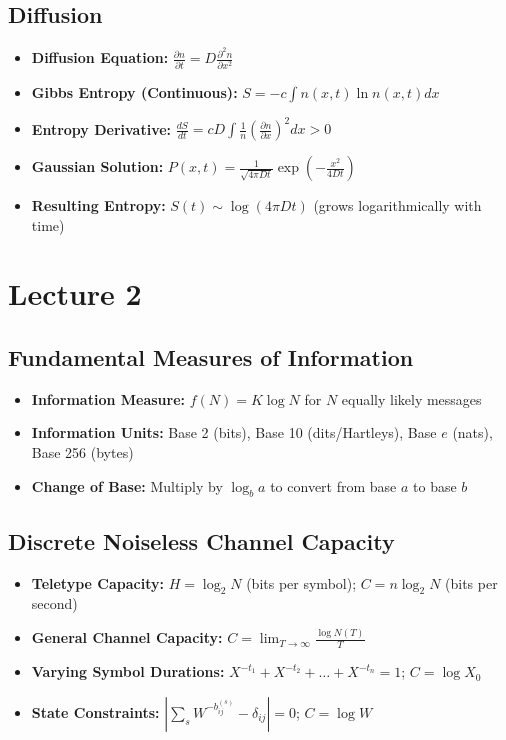 \documentclass[12pt]{article}
\begin{document}
\subsection*{Diffusion}
\begin{itemize}
    \item \textbf{Diffusion Equation:} $\frac{\partial n}{\partial t} = D \frac{\partial^2 n}{\partial x^2}$
    \item \textbf{Gibbs Entropy (Continuous):} $S = -c \int n(x,t) \ln n(x,t) dx$
    \item \textbf{Entropy Derivative:} $\frac{dS}{dt} = cD \int \frac{1}{n}\left(\frac{\partial n}{\partial x}\right)^2 dx > 0$
    \item \textbf{Gaussian Solution:} $P(x,t) = \frac{1}{\sqrt{4\pi Dt}} \exp\left(-\frac{x^2}{4Dt}\right)$
    \item \textbf{Resulting Entropy:} $S(t) \sim \log(4\pi Dt)$ (grows logarithmically with time)
\end{itemize}
\newpage

\section{Lecture 2}
\subsection*{Fundamental Measures of Information}
\begin{itemize}
    \item \textbf{Information Measure:} $f(N) = K \log N$ for $N$ equally likely messages
    \item \textbf{Information Units:} Base 2 (bits), Base 10 (dits/Hartleys), Base $e$ (nats), Base 256 (bytes)
    \item \textbf{Change of Base:} Multiply by $\log_b a$ to convert from base $a$ to base $b$
\end{itemize}

\subsection*{Discrete Noiseless Channel Capacity}
\begin{itemize}
    \item \textbf{Teletype Capacity:} $H = \log_2 N$ (bits per symbol); $C = n \log_2 N$ (bits per second)
    \item \textbf{General Channel Capacity:} $C = \lim_{T \to \infty} \frac{\log N(T)}{T}$
    \item \textbf{Varying Symbol Durations:} $X^{-t_1} + X^{-t_2} + \dots + X^{-t_n} = 1$; $C = \log X_0$
    \item \textbf{State Constraints:} $\left| \sum_s W^{-b_{ij}^{(s)}} - \delta_{ij} \right| = 0$; $C = \log W$
\end{itemize}
\end{document}
